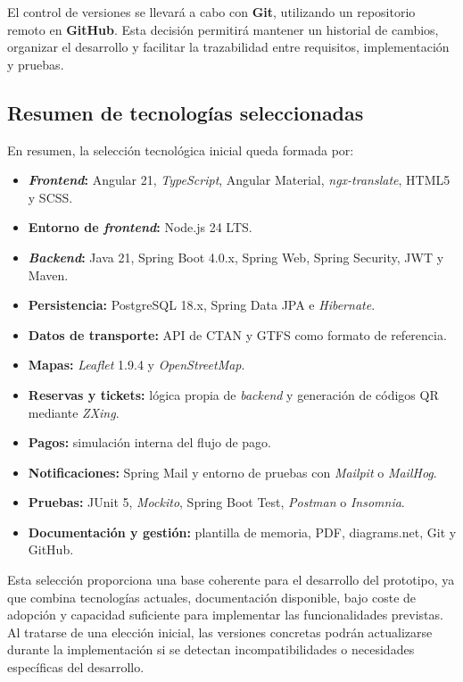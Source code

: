 El control de versiones se llevará a cabo con \textbf{Git}, utilizando un repositorio remoto en \textbf{GitHub}. Esta decisión permitirá mantener un historial de cambios, organizar el desarrollo y facilitar la trazabilidad entre requisitos, implementación y pruebas.

\subsection{Resumen de tecnologías seleccionadas}

En resumen, la selección tecnológica inicial queda formada por:

\begin{itemize}
    \item \textbf{\textit{Frontend}:} Angular 21, \textit{TypeScript}, Angular Material, \textit{ngx-translate}, HTML5 y SCSS.
    \item \textbf{Entorno de \textit{frontend}:} Node.js 24 LTS.
    \item \textbf{\textit{Backend}:} Java 21, Spring Boot 4.0.x, Spring Web, Spring Security, JWT y Maven.
    \item \textbf{Persistencia:} PostgreSQL 18.x, Spring Data JPA e \textit{Hibernate}.
    \item \textbf{Datos de transporte:} API de CTAN y GTFS como formato de referencia.
    \item \textbf{Mapas:} \textit{Leaflet} 1.9.4 y \textit{OpenStreetMap}.
    \item \textbf{Reservas y tickets:} lógica propia de \textit{backend} y generación de códigos QR mediante \textit{ZXing}.
    \item \textbf{Pagos:} simulación interna del flujo de pago.
    \item \textbf{Notificaciones:} Spring Mail y entorno de pruebas con \textit{Mailpit} o \textit{MailHog}.
    \item \textbf{Pruebas:} JUnit 5, \textit{Mockito}, Spring Boot Test, \textit{Postman} o \textit{Insomnia}.
    \item \textbf{Documentación y gestión:} plantilla de memoria, PDF, diagrams.net, Git y GitHub.
\end{itemize}

Esta selección proporciona una base coherente para el desarrollo del prototipo, ya que combina tecnologías actuales, documentación disponible, bajo coste de adopción y capacidad suficiente para implementar las funcionalidades previstas. Al tratarse de una elección inicial, las versiones concretas podrán actualizarse durante la implementación si se detectan incompatibilidades o necesidades específicas del desarrollo.



